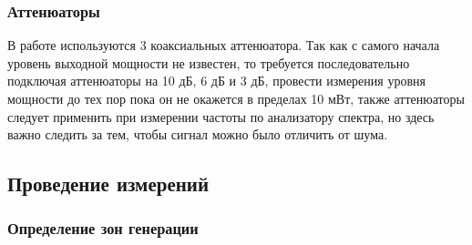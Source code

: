 \documentclass[a4paper,14pt]{extarticle}
\begin{document}
    \subsubsection{Аттенюаторы}
	
	В работе используются 3 коаксиальных аттенюатора. Так как с самого начала уровень выходной мощности не известен, то требуется последовательно подключая аттенюаторы на 10 дБ, 6 дБ и 3 дБ, провести измерения уровня мощности до тех пор пока он не окажется в пределах 10 мВт, также аттенюаторы следует применить при измерении частоты по анализатору спектра, но здесь важно следить за тем, чтобы сигнал можно было отличить от шума. 
    
	\subsection{Проведение измерений}

	\subsubsection{Определение зон генерации}
	
\end{document}
